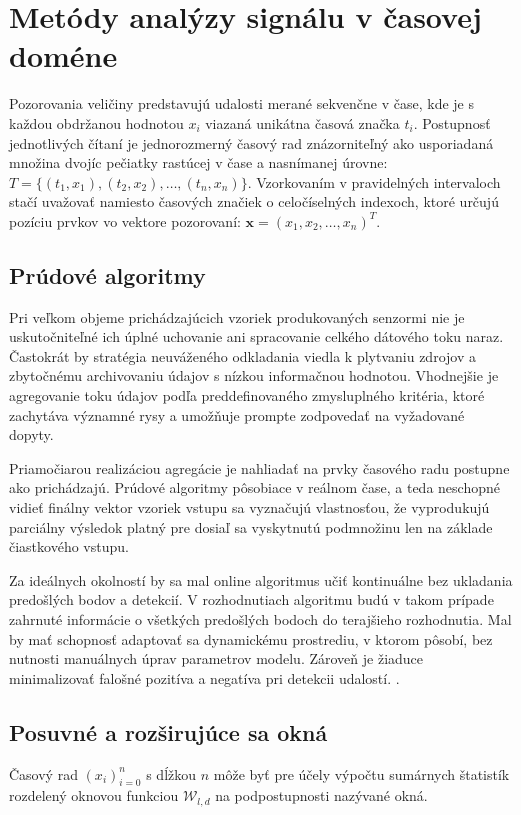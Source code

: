 \section{Metódy analýzy signálu v časovej doméne}
Pozorovania veličiny predstavujú udalosti merané sekvenčne v čase, kde je s každou obdržanou hodnotou $x_i$ viazaná unikátna
časová značka $t_i$. Postupnosť jednotlivých čítaní je jednorozmerný časový rad znázorniteľný ako usporiadaná množina dvojíc pečiatky
rastúcej v čase a nasnímanej úrovne: $T = \{(t_1, x_1),(t_2, x_2), …, (t_n, x_n)\}$. Vzorkovaním v pravidelných intervaloch stačí
uvažovať namiesto časových značiek o celočíselných indexoch, ktoré určujú pozíciu prvkov vo vektore pozorovaní:
$\mathbf{x} = (x_1, x_2, …, x_n)^T$.

\subsection{Prúdové algoritmy}
Pri veľkom objeme prichádzajúcich vzoriek produkovaných senzormi nie je uskutočniteľné ich úplné uchovanie ani spracovanie celkého
dátového toku naraz. Častokrát by stratégia neuváženého odkladania viedla k plytvaniu zdrojov a zbytočnému archivovaniu
údajov s nízkou informačnou hodnotou. Vhodnejšie je agregovanie toku údajov podľa preddefinovaného zmysluplného kritéria,
ktoré zachytáva významné rysy a umožňuje prompte zodpovedať na vyžadované dopyty.

Priamočiarou realizáciou agregácie je nahliadať na prvky časového radu postupne ako prichádzajú.
Prúdové algoritmy pôsobiace v reálnom čase, a teda neschopné vidieť finálny vektor vzoriek vstupu sa vyznačujú vlastnosťou,
že vyprodukujú parciálny výsledok platný pre dosiaľ sa vyskytnutú podmnožinu len na základe čiastkového vstupu.

Za ideálnych okolností by sa mal online algoritmus učiť kontinuálne bez ukladania predošlých bodov a detekcií.
V rozhodnutiach algoritmu budú v takom prípade zahrnuté informácie o všetkých predošlých bodoch do terajšieho rozhodnutia.
Mal by mať schopnosť adaptovať sa dynamickému prostrediu, v ktorom pôsobí, bez nutnosti manuálnych úprav parametrov modelu.
Zároveň je žiaduce minimalizovať falošné pozitíva a negatíva pri detekcii udalostí. \cite{data-streams}.

\subsection{Posuvné a rozširujúce sa okná}
Časový rad $\left(x_i\right)_{i = 0}^{n}$ s dĺžkou $n$ môže byť pre účely výpočtu sumárnych štatistík rozdelený oknovou funkciou
$\mathcal{W}_{l, d}$ na podpostupnosti nazývané okná.


